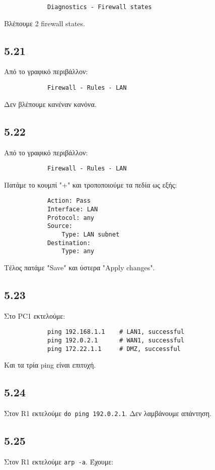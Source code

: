 \documentclass[a4paper, 12pt]{article}
\begin{document}
		\begin{verbatim}
			Diagnostics - Firewall states
		\end{verbatim}
		
		Βλέπουμε 2 firewall states.

	\subsection*{5.21}
		Από το γραφικό περιβάλλον:
		
		\begin{verbatim}
			Firewall - Rules - LAN
		\end{verbatim}
		
		Δεν βλέπουμε κανέναν κανόνα.

	\subsection*{5.22}
		Από το γραφικό περιβάλλον:
		
		\begin{verbatim}
			Firewall - Rules - LAN 
		\end{verbatim}
		
		Πατάμε το κουμπί "+" και τροποποιούμε τα πεδία ως εξής:
		
		\begin{verbatim}
			Action: Pass
			Interface: LAN
			Protocol: any
			Source: 
			    Type: LAN subnet
			Destination: 
			    Type: any
		\end{verbatim}

		Τέλος πατάμε "Save" και ύστερα "Apply changes".
		
	\subsection*{5.23}
		Στο PC1 εκτελούμε:
		
		\begin{verbatim}
			ping 192.168.1.1    # LAN1, successful
			ping 192.0.2.1      # WAN1, successful
			ping 172.22.1.1     # DMZ, successful
		\end{verbatim}
		
		Και τα τρία ping είναι επιτυχή.

	\subsection*{5.24}
		Στον R1 εκτελούμε \verb|do ping 192.0.2.1|. Δεν λαμβάνουμε απάντηση.

	\subsection*{5.25}
		Στον R1 εκτελούμε \verb|arp -a|. Έχουμε:
		
\end{document}
